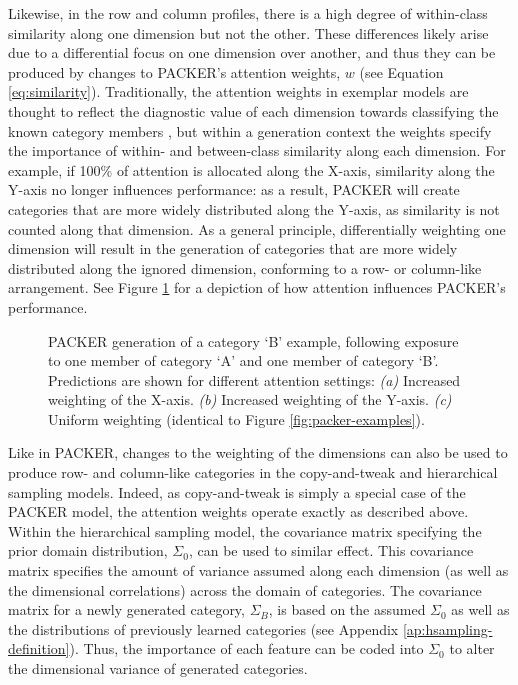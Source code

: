 \documentclass[12pt]{article}
\newcommand\inputpgf[2]{{
\let\pgfimageWithoutPath\pgfimage
\renewcommand{\pgfimage}[2][]{\pgfimageWithoutPath[##1]{#1/##2}}

}}
\begin{document}
\begin{flushleft}
Likewise, in the row and column profiles, there is a high degree of within-class similarity along one dimension but not the other. These differences likely arise due to a differential focus on one dimension over another, and thus they can be produced by changes to PACKER's attention weights, $w$ (see Equation \ref{eq:similarity}). Traditionally, the attention weights in exemplar models are thought to reflect the diagnostic value of each dimension towards classifying the known category members \citep{nosofsky1984choice,nosofsky1986attention,kruschke1992alcove}, but within a generation context the weights specify the importance of within- and between-class similarity along each dimension. For example, if 100\% of attention is allocated along the X-axis, similarity along the Y-axis no longer influences performance: as a result, PACKER will create categories that are more widely distributed along the Y-axis, as similarity is not counted along that dimension. As a general principle, differentially weighting one dimension will result in the generation of categories that are more widely distributed along the ignored dimension, conforming to a row- or column-like arrangement. See Figure \ref{fig:packer-attention} for a depiction of how attention influences PACKER's performance. 

\begin{figure}
    \begin{center}
    \inputpgf{figs/}{packer-attention-examples.pgf}
    \caption{PACKER generation of a category `B' example, following exposure to one member of category `A' and one member of category `B'. Predictions are shown for different attention settings: \textit{(a)} Increased weighting of the X-axis. \textit{(b)} Increased weighting of the Y-axis. \textit{(c)} Uniform weighting (identical to Figure \ref{fig:packer-examples}).}
    \label{fig:packer-attention}
    \end{center}
\end{figure}

Like in PACKER, changes to the weighting of the dimensions can also be used to produce row- and column-like categories in the copy-and-tweak and hierarchical sampling models. Indeed, as copy-and-tweak is simply a special case of the PACKER model, the attention weights operate exactly as described above. Within the hierarchical sampling model, the covariance matrix specifying the prior domain distribution, $\Sigma_0$, can be used to similar effect. This covariance matrix specifies the amount of variance assumed along each dimension (as well as the dimensional correlations) across the domain of categories. The covariance matrix for a newly generated category, $\Sigma_B$, is based on the assumed $\Sigma_0$ as well as the distributions of previously learned categories (see Appendix \ref{ap:hsampling-definition}). Thus, the importance of each feature can be coded into $\Sigma_0$ to alter the dimensional variance of generated categories.


\end{flushleft}
\end{document}
